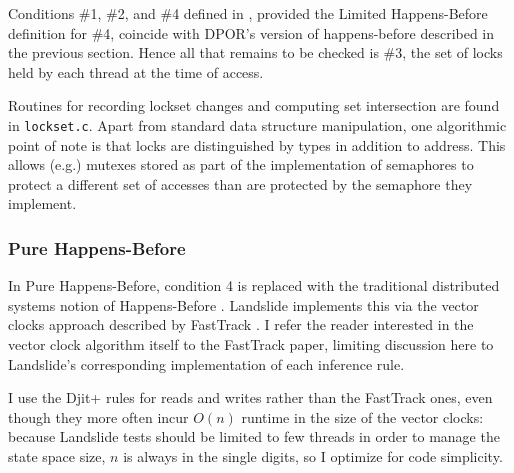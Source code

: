 Conditions \#1, \#2, and \#4 defined in \sect{\ref{sec:background-hb}},
provided the Limited Happens-Before definition for \#4,
coincide with DPOR's version of happens-before described in the previous section.
Hence all that remains to be checked is \#3, the set of locks held by each thread at the time of access.

Routines for recording lockset changes and computing set intersection are found in {\tt lockset.c}.
Apart from standard data structure manipulation,
one algorithmic point of note is that locks are distinguished by types in addition to address.
This allows (e.g.) mutexes stored as part of the implementation of semaphores to protect a different set of accesses than are protected by the semaphore they implement.


\subsubsection{Pure Happens-Before}
\label{sec:landslide-phb}

In Pure Happens-Before,
condition 4 is replaced with the traditional distributed systems notion of Happens-Before \cite{lamport-clocks}.
Landslide implements this via the vector clocks approach described by {\sc FastTrack} \cite{fasttrack}.
I refer the reader interested in the vector clock algorithm itself to the {\sc FastTrack} paper,
limiting discussion here to Landslide's corresponding implementation of each inference rule.

I use the {\sc Djit+} rules for reads and writes rather than the {\sc FastTrack} ones,
even though they more often incur $O(n)$ runtime in the size of the vector clocks:
because Landslide tests should be limited to few threads in order to manage the state space size,
$n$ is always in the single digits, so I optimize for code simplicity.

